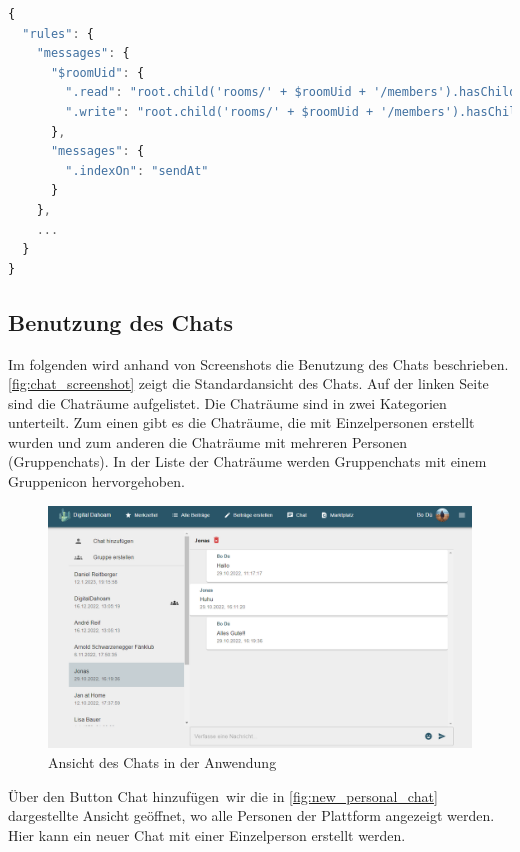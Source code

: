 \begin{lstlisting}[language=JavaScript, caption=Realtime DB Regeln für Chatnachrichten, label={lst:rules_realtime_db}]
{
  "rules": {
    "messages": {
      "$roomUid": {
        ".read": "root.child('rooms/' + $roomUid + '/members').hasChild(auth.uid)",
        ".write": "root.child('rooms/' + $roomUid + '/members').hasChild(auth.uid)"
      },
      "messages": {
        ".indexOn": "sendAt"
      }
    },
    ...
  }
}
\end{lstlisting}

\subsection{Benutzung des Chats}
\label{sec:benutzung_chat}

Im folgenden wird anhand von Screenshots die Benutzung des Chats beschrieben. \autoref{fig:chat_screenshot} zeigt die Standardansicht des Chats. Auf der linken Seite sind die Chaträume aufgelistet. Die Chaträume sind in zwei Kategorien unterteilt. Zum einen gibt es die Chaträume, die mit Einzelpersonen erstellt wurden und zum anderen die Chaträume mit mehreren Personen (Gruppenchats). In der Liste der Chaträume werden Gruppenchats mit einem Gruppenicon hervorgehoben.

\begin{figure}[!htb]
    \centering
    \includegraphics[width=1\textwidth]{figures/boas/21_chat.png}
    \caption[]{Ansicht des Chats in der Anwendung}
    \label{fig:chat_screenshot}
\end{figure}

Über den Button \glqq Chat hinzufügen\grqq \ wir die in \autoref{fig:new_personal_chat} dargestellte Ansicht geöffnet, wo alle Personen der Plattform angezeigt werden. Hier kann ein neuer Chat mit einer Einzelperson erstellt werden.

